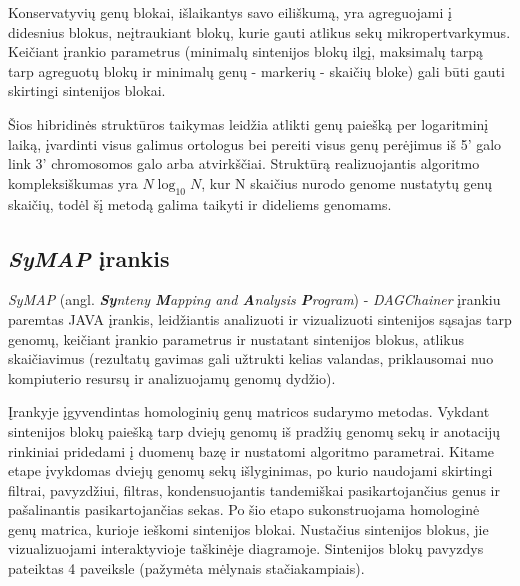 \documentclass[12pt]{article}
\begin{document}
Konservatyvių genų blokai, išlaikantys savo eiliškumą, yra agreguojami į
didesnius blokus, neįtraukiant blokų, kurie gauti atlikus sekų
mikropertvarkymus. Keičiant įrankio parametrus (minimalų sintenijos blokų
ilgį, maksimalų tarpą tarp agreguotų blokų ir minimalų genų - markerių - skaičių
bloke) gali būti gauti skirtingi sintenijos blokai.

Šios hibridinės struktūros taikymas leidžia atlikti genų paiešką per logaritminį
laiką, įvardinti visus galimus ortologus bei pereiti visus genų perėjimus iš 5'
galo link 3' chromosomos galo arba atvirkščiai. Struktūrą realizuojantis
algoritmo kompleksiškumas yra $ N\log_{10}N $, kur N skaičius nurodo genome
nustatytų genų skaičių, todėl šį metodą galima taikyti ir dideliems genomams.

\subsection{\emph{SyMAP} įrankis}
\emph{SyMAP}\cite{SYMAP} (angl. \emph{\textbf{Sy}nteny \textbf{M}apping and
\textbf{A}nalysis \textbf{P}rogram}) - \emph{DAGChainer}\cite{DAGCHAINER}
įrankiu paremtas JAVA įrankis, leidžiantis analizuoti ir vizualizuoti sintenijos
sąsajas tarp genomų, keičiant įrankio parametrus ir nustatant sintenijos blokus,
atlikus skaičiavimus (rezultatų gavimas gali užtrukti kelias valandas,
priklausomai nuo kompiuterio resursų ir analizuojamų genomų dydžio).

Įrankyje įgyvendintas homologinių genų matricos sudarymo metodas. Vykdant
sintenijos blokų paiešką tarp dviejų genomų iš pradžių genomų sekų ir anotacijų
rinkiniai pridedami į duomenų bazę ir nustatomi algoritmo parametrai. Kitame
etape įvykdomas dviejų genomų sekų išlyginimas, po kurio naudojami skirtingi
filtrai, pavyzdžiui, filtras, kondensuojantis tandemiškai pasikartojančius
genus ir pašalinantis pasikartojančias sekas. Po šio etapo sukonstruojama
homologinė genų matrica, kurioje ieškomi sintenijos blokai. Nustačius sintenijos
blokus, jie vizualizuojami interaktyvioje taškinėje diagramoje. Sintenijos blokų
pavyzdys pateiktas 4 paveiksle (pažymėta mėlynais stačiakampiais).
\end{document}
